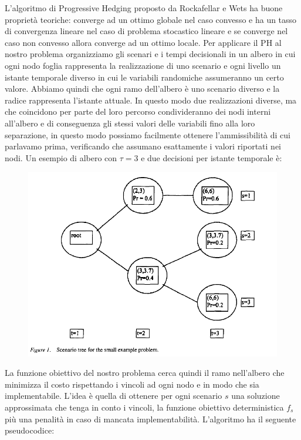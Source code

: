 \documentclass[
]{article}
\begin{document}
L'algoritmo di Progressive Hedging proposto da Rockafellar e Wets ha
buone proprietà teoriche: converge ad un ottimo globale nel caso
convesso e ha un tasso di convergenza lineare nel caso di problema
stocastico lineare e se converge nel caso non convesso allora converge
ad un ottimo locale. Per applicare il PH al nostro problema organizziamo
gli scenari e i tempi decisionali in un albero in cui ogni nodo foglia
rappresenta la realizzazione di uno scenario e ogni livello un istante
temporale diverso in cui le variabili randomiche assumeranno un certo
valore. Abbiamo quindi che ogni ramo dell'albero è uno scenario diverso e la radice rappresenta l'istante attuale. In questo modo due
realizzazioni diverse, ma che coincidono per parte del loro percorso
condivideranno dei nodi interni all'albero e di conseguenza gli stessi
valori delle variabili fino alla loro separazione, in questo modo
possiamo facilmente ottenere l'ammissibilità di cui parlavamo prima,
verificando che assumano esattamente i valori riportati nei nodi. Un
esempio di albero con {\(\tau = 3\)} e due decisioni per istante
temporale è:
\begin{figure}[h!]
    \centering
    \includegraphics[width=0.8\columnwidth]{Images/ScenarioTree.png}
    \label{fig:ScenatioTree}
\end{figure}


La funzione obiettivo del nostro problema cerca quindi il ramo
nell'albero che minimizza il costo rispettando i vincoli ad ogni nodo e
in modo che sia implementabile. L'idea è quella di ottenere per ogni
scenario {\(s\)} una soluzione approssimata che tenga in conto i
vincoli, la funzione obiettivo deterministica {\(f_{s}\)} più una
penalità in caso di mancata implementabilità. L'algoritmo ha il seguente pseudocodice:
\end{document}
